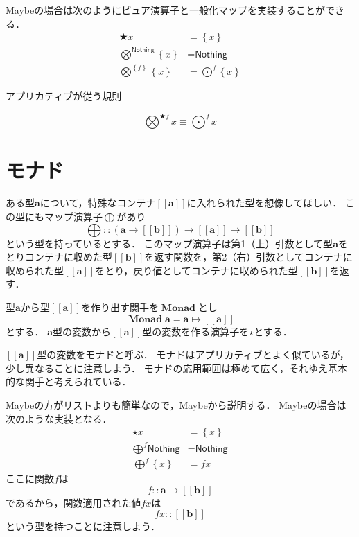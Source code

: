 \documentclass[twocolumn]{jsbook}
\newcommand{\applicativefunc}{\bigotimes} %
\newcommand{\haskelllambda}{\backslash}
\newcommand{\mapfunc}{\bigodot} %
\newcommand{\monadfunc}{\bigoplus}
\newcommand{\pure}{\bigstar} %
\newcommand{\unit}{\star} %
\newcommand{\typename}[1]{\bm{#1}}
\newcommand{\maybe}[1]{\left\{#1\right\}}
\newcommand{\monad}[1]{\left[\!\left[#1\right]\!\right]}
\newcommand{\functor}[1]{\mathop{\textbf{#1}}}
\newcommand{\monadfunctor}{\mathop{\functor{Monad}}}
\newcommand{\specialkeyword}[1]{\textsf{#1}}
\newcommand{\nothing}{\specialkeyword{Nothing}}
\begin{document}
Maybeの場合は次のようにピュア演算子と一般化マップを実装することができる．
\begin{align*}
\pure x&=\maybe{x}\\
\applicativefunc^{\nothing}\maybe{x}&=\nothing\\
\applicativefunc^{\maybe{f}}\maybe{x}&=\mapfunc^f\maybe{x}
\end{align*}



アプリカティブが従う規則

$$\applicativefunc^{\pure f}x\equiv\mapfunc^fx$$

\section{モナド}

ある型$\typename{a}$について，特殊なコンテナ$\monad{\typename{a}}$に入れられた型を想像してほしい．
この型にもマップ演算子$\monadfunc$があり$$\monadfunc::\left(\typename{a}\rightarrow\monad{\typename{b}}\right)\rightarrow\monad{\typename{a}}\rightarrow{\monad{\typename{b}}}$$という型を持っているとする．
このマップ演算子は第1（上）引数として型$\typename{a}$をとりコンテナに収めた型$\monad{\typename{b}}$を返す関数を，第2（右）引数としてコンテナに収められた型$\monad{\typename{a}}$をとり，戻り値としてコンテナに収められた型$\monad{\typename{b}}$を返す．

型$\typename{a}$から型$\monad{\typename{a}}$を作り出す関手を$\monadfunctor$とし$$\monadfunctor\typename{a}=\typename{a}\mapsto\monad{\typename{a}}$$とする．
$\typename{a}$型の変数から$\monad{\typename{a}}$型の変数を作る演算子を$\unit$とする．

$\monad{\typename{a}}$型の変数をモナドと呼ぶ．
モナドはアプリカティブとよく似ているが，少し異なることに注意しよう．
モナドの応用範囲は極めて広く，それゆえ基本的な関手と考えられている．

Maybeの方がリストよりも簡単なので，Maybeから説明する．
Maybeの場合は次のような実装となる．
\begin{align*}
\unit x&=\maybe{x}\\
\monadfunc^f\nothing&=\nothing\\
\monadfunc^f\maybe{x}&=fx
\end{align*}
ここに関数$f$は$$f::\typename{a}\rightarrow\monad{\typename{b}}$$であるから，関数適用された値$fx$は$$fx::\monad{\typename{b}}$$という型を持つことに注意しよう．
\end{document}

